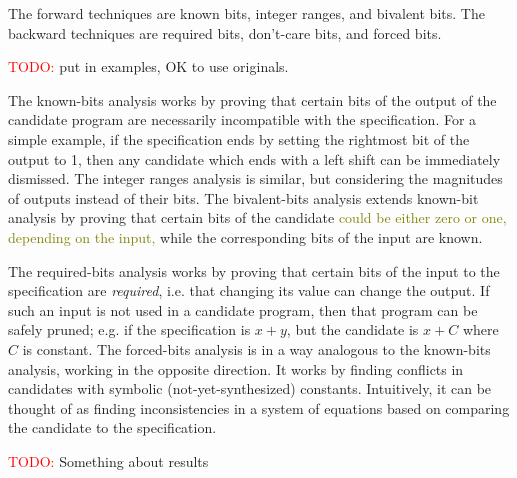 \documentclass[12pt,twoside]{reedthesis}
\newcommand{\red}[1]{\textcolor{red}{#1}}
\newcommand{\green}[1]{\textcolor{olive}{#1}}
\newcommand{\addressed}[2]{{#1}}
\begin{document}
The forward techniques are 
    known bits,
    integer ranges, and
    bivalent bits.
The backward techniques are 
    required bits,
    don't-care bits, and
    forced bits.
    
\red{TODO:} put in examples, OK to use originals.
    
The known-bits analysis works by proving that certain bits of the output of the candidate program are necessarily incompatible with the specification.
For a simple example, if the specification ends by setting the rightmost bit of the output to 1, then any candidate which ends with a left shift can be immediately dismissed.
The integer ranges analysis is similar, but considering the magnitudes of outputs instead of their bits.
The bivalent-bits analysis extends known-bit analysis by proving that certain bits of the candidate \green{could be either zero or one, depending on the input,}
while the corresponding bits of the input are known.
    
The required-bits analysis works by proving that certain bits of the input to the specification are \textit{required}, i.e. that changing its value can change the output.
    If such an input is not used in a candidate program, then that program can be safely pruned;
        e.g. if the specification is $x + y$, but the candidate is $x + C$ where $C$ is constant.
The forced-bits analysis is in a way analogous to the known-bits analysis, working in the opposite direction.
    It works by finding conflicts in candidates with symbolic (not-yet-synthesized) constants.
    Intuitively, it can be thought of as finding inconsistencies in a system of equations based on comparing the candidate to the specification. %
    
\red{TODO:} Something about results
    
\end{document}
